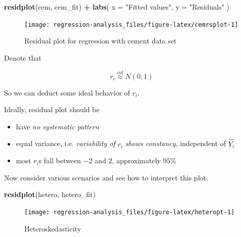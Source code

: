 \documentclass[]{book}
\newenvironment{Shaded}{\begin{snugshade}}{\end{snugshade}}
\newcommand{\DataTypeTok}[1]{\textcolor[rgb]{0.13,0.29,0.53}{#1}}
\newcommand{\KeywordTok}[1]{\textcolor[rgb]{0.13,0.29,0.53}{\textbf{#1}}}
\newcommand{\NormalTok}[1]{#1}
\newcommand{\OperatorTok}[1]{\textcolor[rgb]{0.81,0.36,0.00}{\textbf{#1}}}
\newcommand{\StringTok}[1]{\textcolor[rgb]{0.31,0.60,0.02}{#1}}
\theoremstyle{definition}
\theoremstyle{definition}
\theoremstyle{definition}
\theoremstyle{remark}
\let\BeginKnitrBlock\begin \let\EndKnitrBlock\end
\begin{document}
\begin{Shaded}
\begin{Highlighting}[]
\KeywordTok{residplot}\NormalTok{(cem, cem_fit) }\OperatorTok{+}
\StringTok{  }\KeywordTok{labs}\NormalTok{(}
    \DataTypeTok{x =} \StringTok{"Fitted values"}\NormalTok{,}
    \DataTypeTok{y =} \StringTok{"Residuals"}
\NormalTok{  )}
\end{Highlighting}
\end{Shaded}

\begin{figure}[H]

{\centering \texttt{[image: regression-analysis\_files/figure-latex/cemrsplot-1]} 

}

\caption{Residual plot for regression with cement data set}\label{fig:cemrsplot}
\end{figure}

Denote that

\[r_i \stackrel{iid}{\approx} N(0, 1)\]

So we can deduct some ideal behavior of \(r_i\).

\BeginKnitrBlock{remark}
{}Ideally, residual plot should be

\begin{itemize}
  \item have \textit{no systematic pattern}
  \item equal variance, i.e. \textit{variability of} $r_i$ \textit{shows constancy}, independent of $\hat{Y_i}$
  \item most $r_i$s fall between $-2$ and $2$, approximately $95\%$
\end{itemize}
\EndKnitrBlock{remark}

Now consider various scenarios and see how to interpret this plot.

\begin{Shaded}
\begin{Highlighting}[]
\KeywordTok{residplot}\NormalTok{(hetero, hetero_fit)}
\end{Highlighting}
\end{Shaded}

\begin{figure}[H]

{\centering \texttt{[image: regression-analysis\_files/figure-latex/heteropt-1]} 

}

\caption{Heteroskedasticity}\label{fig:heteropt}
\end{figure}
\end{document}
